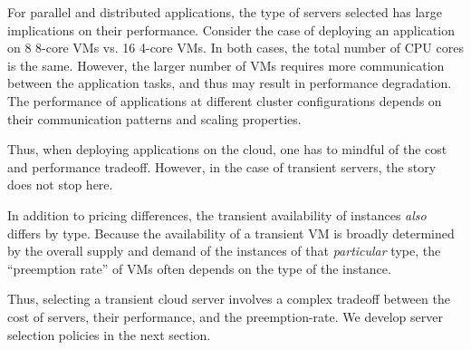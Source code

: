 For parallel and distributed applications, the type of servers selected has large implications on their performance.
Consider the case of deploying an application on 8 8-core VMs vs. 16 4-core VMs.
In both cases, the total number of CPU cores is the same.
However, the larger number of VMs requires more communication between the application tasks, and thus may result in performance degradation.
The performance of applications at different cluster configurations depends on their communication patterns and scaling properties. 



Thus, when deploying applications on the cloud, one has to mindful of the cost and performance tradeoff.
However, in the case of transient servers, the story does not stop here. 


In addition to pricing differences, the transient availability of instances \emph{also} differs by type.
Because the availability of a transient VM is broadly determined by the overall supply and demand of the instances of that \emph{particular} type, the ``preemption rate'' of VMs often depends on the type of the instance.



Thus, selecting a transient cloud server involves a complex tradeoff between the cost of servers, their performance, and the preemption-rate.
We develop server selection policies in the next section.





